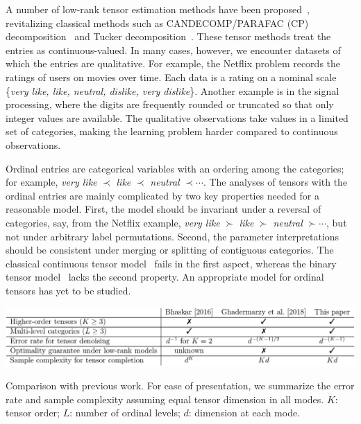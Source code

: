 \documentclass[11pt]{article}
\theoremstyle{plain}
\theoremstyle{definition}
\begin{document}
A number of low-rank tensor estimation methods have been proposed~\citep{kolda2009tensor,acar2010scalable}, revitalizing classical methods such as CANDECOMP/PARAFAC (CP) decomposition~\citep{hitchcock1927expression} and Tucker decomposition~\citep{tucker1966some}. These tensor methods treat the entries as continuous-valued. In many cases, however, we encounter datasets of which the entries are qualitative. For example, the Netflix problem records the ratings of users on movies over time. Each data is a rating on a nominal scale \{{\it very like, like, neutral, dislike, very dislike}\}. Another example is in the signal processing, where the digits are frequently rounded or truncated so that only integer values are available. The qualitative observations take values in a limited set of categories, making the learning problem harder compared to  continuous observations.

 Ordinal entries are categorical variables with an ordering among the categories; for example, {\it very like} $\prec$ {\it like} $\prec$ {\it neutral} $\prec \cdots$. The analyses of tensors with the ordinal entries are mainly complicated by two key properties needed for a reasonable model. First, the model should be invariant under a reversal of categories, say, from the Netflix example, {\it very like} $\succ$ {\it like} $\succ$ {\it neutral} $\succ \cdots$, but not under arbitrary label permutations. Second, the parameter interpretations should be consistent under merging or splitting of contiguous categories. The classical continuous tensor model~\cite{kolda2009tensor, ghadermarzy2019near} fails in the first aspect, whereas the binary tensor model~\cite{ghadermarzy2018learning} lacks the second property. An appropriate model for ordinal tensors has yet to be studied.

\begin{table}[ht]
\centerline{\includegraphics[width=16cm]{compare.pdf}}
\caption{Comparison with previous work. For ease of presentation, we summarize the error rate and sample complexity assuming equal tensor dimension in all modes. $K$: tensor order; $L$: number of ordinal levels; $d$: dimension at each mode. }~\label{tab:compare}
\end{table}
\end{document}
